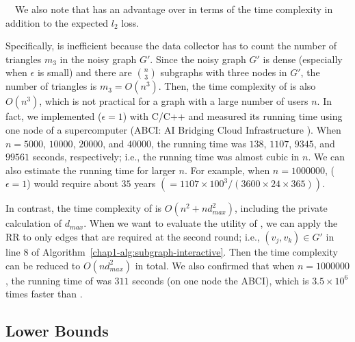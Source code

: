 \smallskip
{}~~We also note that  has an advantage over  in terms of the time complexity in addition to the expected $l_2$ loss. 

Specifically,  is inefficient because the data collector has to count the number of triangles $m_3$ in the noisy graph $G'$. 
Since the noisy graph $G'$ is dense (especially when $\epsilon$ is small) and there are $\binom{n}{3}$ subgraphs with three nodes in $G'$, the number of triangles is $m_3 = O(n^3)$. 
Then, the time complexity of  is 
also $O(n^3)$, which is not practical for a graph with a large number of users $n$.
In fact, we implemented  ($\epsilon=1$) with C/C++ and measured its running time using one node of a supercomputer (ABCI: AI Bridging Cloud Infrastructure \cite{ABCI}). 
When $n=5000$, $10000$, $20000$, and $40000$, the running time was $138$, $1107$, $9345$, and $99561$ seconds, respectively; i.e., the running time was almost cubic in $n$. 
We can also estimate the running time for larger $n$. 
For example, when $n=1000000$,  ($\epsilon=1$) would require about $35$ years $(=1107 \times 100^3 /(3600 \times 24 \times 365))$. 

In contrast, the time complexity of  
is 
$O(n^2 + n d_{max}^2)$, including the private calculation of $d_{max}$. 
When we want to evaluate the utility of , 
we can apply the RR to only edges that are required at the second round; i.e., $(v_j,v_k) \in G'$ in line 8 of Algorithm~\ref{chap1-alg:subgraph-interactive}. 
Then the time complexity 
can be reduced to 
$O(n d_{max}^2)$ in total. 
We also confirmed that 
when $n=1000000$, the running time of  was $311$ seconds (on one node the ABCI), which is $3.5 \times 10^6$ times faster than . 

\subsection{Lower Bounds}
\label{chap1-sub:lower_bounds}

